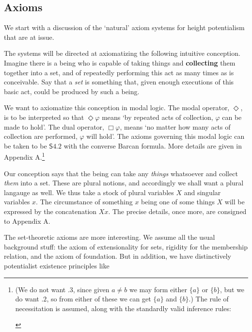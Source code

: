 \documentclass{article}
\begin{document}
\subsection{Axioms}
We start with a discussion of the `natural' axiom systems for height potentialism 
that are at issue.

The systems will be directed at axiomatizing the following 
intuitive conception. Imagine there is a being who is capable of taking things 
and {\bf collecting} them together into a set, and of repeatedly performing this act 
as many times as is conceivable. Say that a \emph{set} is something that, given enough 
executions of this basic act, could be produced by such a being. 

We want to axiomatize this conception in modal logic. The modal operator, $\Diamond$, 
is to be interpreted so that $\Diamond \varphi$ means
`by repeated acts of collection, $\varphi$ can be made to hold'. The dual 
operator, $\Box \varphi$, means `no matter how many acts of collection are performed, 
$\varphi$ will hold'. The axioms governing this modal logic can be taken to be 
$\mathsf{S4.2}$ with the converse Barcan formula. More details are given in Appendix A.\footnote{(We do not want $.3$, 
since given $a \not= b$ we may form either $\{a\}$ or $\{b\}$, but we do want 
$.2$,
so from either of these we can get $\{a\}$ and $\{b\}$.) The rule of necessitation 
is assumed, along with the standardly valid inference rules:
\begin{prooftree}
\end{prooftree}}
 
Our conception says that the being can take any \emph{things} whatsoever and collect 
\emph{them} into a set. These are plural notions, and accordingly we shall want a plural 
langauge as well. We thus take a stock of plural variables $X$ and singular variables $x$.
The circumstance of something $x$ being one of some things $X$ will be expressed by 
the concatenation $Xx$. The precise details, once more,  are consigned to Appendix A. 

The set-theoretic axioms are more interesting. We assume all the usual 
background stuff: the axiom of extensionality for sets, rigidity for the 
membership relation, and the axiom of foundation. But in addition, we have 
distinctively potentialist existence principles like
\end{document}
